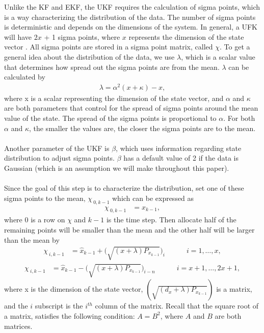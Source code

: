 \begin{enumerate}
\noindent Unlike the KF and EKF, the UKF requires the calculation of sigma points, which is a way characterizing the distribution of the data. The number of sigma points is deterministic and depends on the dimensions of the system. In general, a UFK will have  $2x$ + 1 sigma points, where $x$ represents the dimension of the state vector \cite{inbook, inproceedings, Wan01theunscented}.  All sigma points are stored in a sigma point matrix, called $\chi$. To get a general idea about the distribution of the data, we use $\lambda$, which is a scalar value that determines how spread out the sigma points are from the mean. $\lambda$ can be calculated by
         \begin{align*}
        \lambda = \alpha^{2}(x+\kappa)-x,
         \end{align*}
         where x is a scalar representing the dimension of the state vector, and $\alpha$ and $\kappa$ are both parameters that control for the spread of sigma points around the mean value of the state. The spread of the sigma points is proportional to $\alpha$. For both $\alpha$ and $\kappa $,  the smaller the values are, the closer the sigma points are to the mean.\\ \\
       Another parameter of the UKF is $\beta$, which uses information regarding state distribution to adjust sigma points. $\beta$ has a default value of 2 if the data is Gaussian (which is an assumption we will make throughout this paper).  \\ \\
       Since the goal of this step is to characterize the distribution, set one of these sigma points to the mean, $\chi_{\ 0,k-1}$ which can be expressed as 
    \begin{align*}
        \chi_{\ 0,k-1} &= x_{k-1} ,
     \end{align*}
     where 0 is a row on $\chi$ and $k-1$ is the time step. Then allocate half of the remaining points will be smaller than the mean and the other half will be larger than the mean by
         \begin{align*}
        \chi_{\ i,k-1} &= \hat{x}_{k-1} +  \bigg(\sqrt{(x+\lambda )P_{x_{k-1}}}\bigg)_{i} \quad \quad \quad i=1,\dots, x, 
        \end{align*}
         \begin{align*}
        \chi_{\ i,k-1} &= \hat{x}_{k-1} - \bigg(\sqrt{(x+\lambda )P_{x_{k-1}}}\bigg)_{i-n} \quad \quad \quad i=x + 1,\dots,2x + 1,
        \end{align*}
        where x is the dimension of the state vector, $(\sqrt{(d_{x}+\lambda)P_{x_{k-1}}})$ is a matrix, and the $i$ subscript is the $i^{th}$ column of the matrix. 
        Recall that the square root of a matrix, satisfies the following condition: $A = B^2$, where $A$ and $B$ are both matrices. 
        

\end{enumerate}
